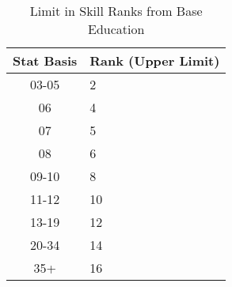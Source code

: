 
\begin{table}[h]
	\begin{tabular}{c|l} \label{Table:SkillLimit}
	Stat Basis & Rank (Upper Limit) \\
	\hline
	03-05		& 2 \\
	06			& 4 \\
	07			& 5 \\
	08			& 6 \\
	09-10		& 8 \\
	11-12		& 10 \\
	13-19		& 12 \\
	20-34		& 14 \\
	35+			& 16 \\
    \end{tabular}
    \caption{Limit in Skill Ranks from Base Education}
\end{table}

